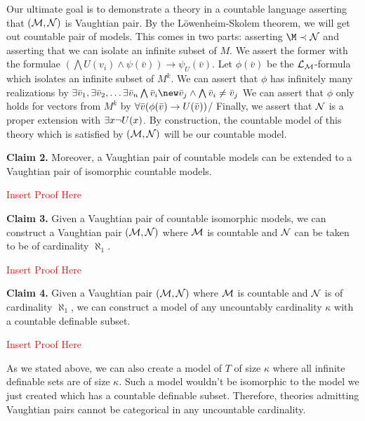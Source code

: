 Our ultimate goal is to demonstrate a theory in a countable language asserting that \((\mathcal{M}, \mathcal{N})\) is Vaughtian pair.
By the L\"owenheim-Skolem theorem, we will get out countable pair of models.
This comes in two parts: asserting \(\M \prec \mcN\) and asserting that we can isolate an infinite subset of \(M\). 
We assert the former with the formulae \((\bigwedge U(v_i) \land \psi(\bar{v})) \to \psi_U(\bar{v})\). 
Let \(\phi(\bar{v})\) be the \(\mathcal{L}_{\mathcal{M}}\)-formula which isolates an infinite subset of \(M^k\). 
We can assert that \(\phi\) has infinitely many realizations by \(\E \bar{v}_1, \E \bar{v}_2, \ldots \E \bar{v}_n \bigwedge \bar{v}_i \new \bar{v}_j \land \bigwedge \bar{v}_i \neq \bar{v}_j\)
We can assert that \(\phi\) only holds for vectors from \(M^k\) by \(\forall \bar{v} (\phi(\bar{v}) \to U(\bar{v}))\)/
Finally, we assert that \(\mathcal{N}\) is a proper extension with \(\exists x \neg U(x)\). 
By construction, the countable model of this theory which is satisfied by \((\mathcal{M}, \mathcal{N})\) will be our countable model.

\textbf{Claim 2.} Moreover, a Vaughtian pair of countable models can be extended to a Vaughtian pair of isomorphic countable models.

\textcolor{red}{Insert Proof Here}

\textbf{Claim 3.} Given a Vaughtian pair of countable isomorphic models, we can construct a Vaughtian pair \((\mathcal{M}, \mathcal{N})\) where \(\mathcal{M}\) is countable and \(\mathcal{N}\) can be taken to be of cardinality \(\aleph_1\).

\textcolor{red}{Insert Proof Here}

\textbf{Claim 4.} Given a Vaughtian pair \((\mathcal{M}, \mathcal{N})\) where \(\mathcal{M}\) is countable and \(\mathcal{N}\) is of cardinality \(\aleph_1\), we can construct a model of any uncountably cardinality \(\kappa\) with a countable definable subset. 

\textcolor{red}{Insert Proof Here}

As we stated above, we can also create a model of \(T\) of size \(\kappa\) where all infinite definable sets are of size \(\kappa\). 
Such a model wouldn't be isomorphic to the model we just created which has a countable definable subset. 
Therefore, theories admitting Vaughtian pairs cannot be categorical in any uncountable cardinality.
